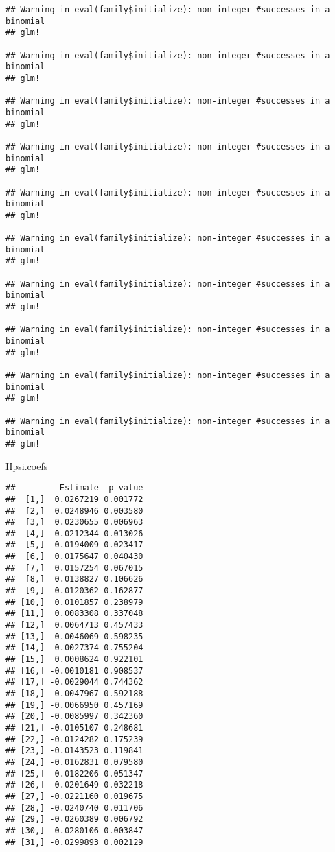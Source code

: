 \documentclass[10pt,]{book}
\newenvironment{Shaded}{\begin{snugshade}}{\end{snugshade}}
\newcommand{\NormalTok}[1]{#1}
\begin{document}
\begin{verbatim}
## Warning in eval(family$initialize): non-integer #successes in a binomial
## glm!

## Warning in eval(family$initialize): non-integer #successes in a binomial
## glm!

## Warning in eval(family$initialize): non-integer #successes in a binomial
## glm!

## Warning in eval(family$initialize): non-integer #successes in a binomial
## glm!

## Warning in eval(family$initialize): non-integer #successes in a binomial
## glm!

## Warning in eval(family$initialize): non-integer #successes in a binomial
## glm!

## Warning in eval(family$initialize): non-integer #successes in a binomial
## glm!

## Warning in eval(family$initialize): non-integer #successes in a binomial
## glm!

## Warning in eval(family$initialize): non-integer #successes in a binomial
## glm!

## Warning in eval(family$initialize): non-integer #successes in a binomial
## glm!
\end{verbatim}

\begin{Shaded}
\begin{Highlighting}[]
\NormalTok{Hpsi.coefs}
\end{Highlighting}
\end{Shaded}

\begin{verbatim}
##         Estimate  p-value
##  [1,]  0.0267219 0.001772
##  [2,]  0.0248946 0.003580
##  [3,]  0.0230655 0.006963
##  [4,]  0.0212344 0.013026
##  [5,]  0.0194009 0.023417
##  [6,]  0.0175647 0.040430
##  [7,]  0.0157254 0.067015
##  [8,]  0.0138827 0.106626
##  [9,]  0.0120362 0.162877
## [10,]  0.0101857 0.238979
## [11,]  0.0083308 0.337048
## [12,]  0.0064713 0.457433
## [13,]  0.0046069 0.598235
## [14,]  0.0027374 0.755204
## [15,]  0.0008624 0.922101
## [16,] -0.0010181 0.908537
## [17,] -0.0029044 0.744362
## [18,] -0.0047967 0.592188
## [19,] -0.0066950 0.457169
## [20,] -0.0085997 0.342360
## [21,] -0.0105107 0.248681
## [22,] -0.0124282 0.175239
## [23,] -0.0143523 0.119841
## [24,] -0.0162831 0.079580
## [25,] -0.0182206 0.051347
## [26,] -0.0201649 0.032218
## [27,] -0.0221160 0.019675
## [28,] -0.0240740 0.011706
## [29,] -0.0260389 0.006792
## [30,] -0.0280106 0.003847
## [31,] -0.0299893 0.002129
\end{verbatim}
\end{document}
